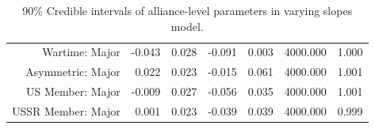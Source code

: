 \documentclass[12pt]{article}
\begin{document}
\begin{table}[ht]
\begin{tabular}{rrrrrrr}
  Wartime: Major & -0.043 & 0.028 & -0.091 & 0.003 & 4000.000 & 1.000 \\ 
  Asymmetric: Major & 0.022 & 0.023 & -0.015 & 0.061 & 4000.000 & 1.001 \\ 
  US Member: Major & -0.009 & 0.027 & -0.056 & 0.035 & 4000.000 & 1.001 \\ 
  USSR Member: Major & 0.001 & 0.023 & -0.039 & 0.039 & 4000.000 & 0.999 \\ 
   \hline
\end{tabular}
\caption{90\% Credible intervals of alliance-level parameters in varying slopes model.}
\label{tab:vary-slopes-alliance}
\end{table}

  
 
\end{document}
